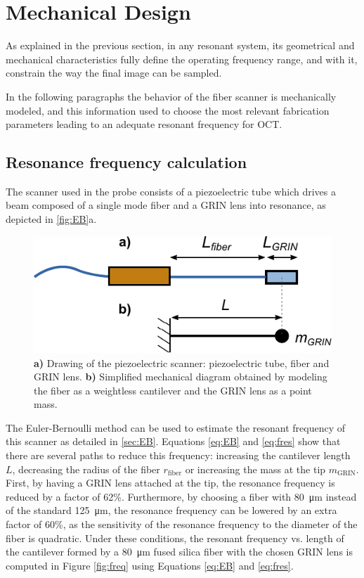 \section{Mechanical Design}
\label{sec:mechDesign}
As explained in the previous section, in any resonant system, its geometrical and mechanical characteristics fully define the operating frequency range, and with it, constrain the way the final image can be sampled.

In the following paragraphs the behavior of the fiber scanner is mechanically modeled, and this information used to choose the most relevant fabrication parameters leading to an adequate resonant frequency for OCT.


\subsection{Resonance frequency calculation}
The scanner used in the probe consists of a piezoelectric tube which drives a beam composed of a single mode fiber and a GRIN lens into resonance, as depicted in \autoref{fig:EB}a.  

\begin{figure}[h!]\centering
      \includegraphics{figures/30_DesignSimulation/Mechanical/EB.pdf}
      \caption{\textbf{a)} Drawing of the piezoelectric scanner: piezoelectric tube, fiber and GRIN lens. 
      \textbf{b)} Simplified mechanical diagram obtained by modeling the fiber as a weightless cantilever and the GRIN lens as a point mass.}
      \label{fig:EB}
\end{figure}

The Euler-Bernoulli method can be used to estimate the resonant frequency of this scanner as detailed in \autoref{sec:EB}. Equations \ref{eq:EB} and \ref{eq:fres} show that there are several paths to reduce this frequency: increasing the cantilever length $L$, decreasing the radius of the fiber $r_\mathrm{fiber}$ or increasing the mass at the tip $m_{\mathrm{GRIN}}$. First, by having a GRIN lens attached at the tip, the resonance frequency is reduced by a factor of 62\%. Furthermore, by choosing a fiber with \SI{80}{\micro\meter} instead of the standard \SI{125}{\micro\meter}, the resonance frequency can be lowered by an extra factor of 60\%, as the sensitivity of the resonance frequency to the diameter of the fiber is quadratic. Under these conditions, the resonant frequency vs. length of the cantilever formed by a \SI{80}{\micro\meter} fused silica fiber with the chosen GRIN lens is computed in Figure \ref{fig:freq} using Equations \ref{eq:EB} and \ref{eq:fres}.

